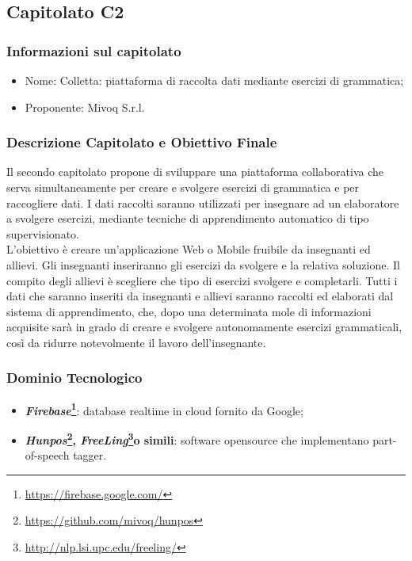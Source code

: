 \subsection{Capitolato C2}\label{C2}

\subsubsection{Informazioni sul capitolato}

\begin{itemize}
	\item Nome: Colletta: piattaforma di raccolta dati mediante esercizi di grammatica;
	\item Proponente: Mivoq S.r.l.
\end{itemize}

\subsubsection{Descrizione Capitolato e Obiettivo Finale}
Il secondo capitolato propone di sviluppare una piattaforma collaborativa che serva simultaneamente per 
creare e svolgere esercizi di grammatica e per raccogliere dati. I dati raccolti saranno utilizzati per insegnare ad un elaboratore a svolgere esercizi, mediante tecniche di apprendimento automatico di tipo supervisionato\glossario.\\
L'obiettivo è creare un'applicazione Web o Mobile fruibile da insegnanti ed allievi. Gli insegnanti inseriranno gli esercizi da svolgere e la relativa soluzione. Il compito degli allievi è scegliere che tipo di esercizi svolgere e completarli. Tutti i dati che saranno inseriti da insegnanti e allievi saranno raccolti ed elaborati dal sistema di apprendimento, che, dopo una determinata mole di informazioni acquisite sarà in grado di creare e svolgere autonomamente esercizi grammaticali, così da ridurre notevolmente il lavoro dell'insegnante.

\subsubsection{Dominio Tecnologico}\label{C2_DomTec}
\begin{itemize}
	\item \textbf{\textit{Firebase}\footnote{\url{https://firebase.google.com/}}\glossario}: database realtime in cloud fornito da Google;
	\item \textbf{\textit{Hunpos}\footnote{\url{https://github.com/mivoq/hunpos}}\glossario, \textit{FreeLing}\footnote{\url{http://nlp.lsi.upc.edu/freeling/}}\glossario o simili}: software opensource che implementano part-of-speech tagger\glossario.
\end{itemize}

